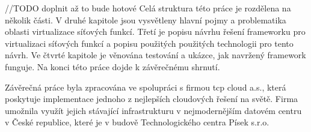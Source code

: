 //TODO doplnit až to bude hotové
Celá struktura této práce je rozdělena na několik části. V druhé kapitole jsou vysvětleny hlavní pojmy a problematika oblasti virtualizace síťových funkcí. Třetí je popisu návrhu řešení frameworku pro virtualizaci síťových funkcí a popisu použitých použitých technologii pro tento návrh. Ve čtvrté kapitole je věnována testování a ukázce, jak navržený framework funguje. Na konci této práce dojde k závěrečnému shrnutí.

Závěrečná práce byla zpracována ve spolupráci s firmou tcp cloud a.s., která poskytuje implementace jednoho z nejlepších cloudových řešení na světě. Firma umožnila využít jejich stávající infrastrukturu v nejmodernějším datovém centru v České republice, které je v budově Technologického centra Písek s.r.o.